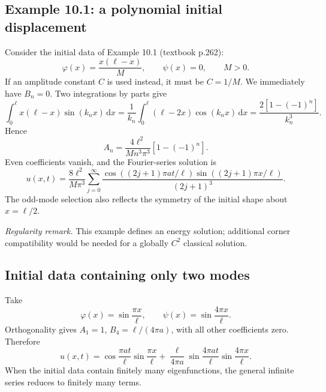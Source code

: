 \documentclass[11pt,a4paper]{article}
\newcommand{\dd}{\,\mathrm{d}}
\newif\ifteachernotes\teachernotesfalse
\newcommand{\teachernote}[1]{\ifteachernotes\par\smallskip
  \noindent\textit{Instructor note.} #1\par\smallskip\fi}
\begin{document}
\subsection{Example 10.1: a polynomial initial displacement}
Consider the initial data of Example 10.1 (textbook p.262):
\begin{equation}
 \varphi(x)=\frac{x(\ell-x)}M,\qquad \psi(x)=0,\qquad M>0.
\end{equation}
If an amplitude constant $C$ is used instead, it must be $C=1/M$.
We immediately have $B_n=0$. Two integrations by parts give
\begin{equation}
 \int_0^\ell x(\ell-x)\sin(k_nx)\dd x
 =\frac1{k_n}\int_0^\ell(\ell-2x)\cos(k_nx)\dd x
 =\frac{2[1-(-1)^n]}{k_n^3}.
\end{equation}
Hence
\begin{equation}
 A_n=\frac{4\ell^2}{Mn^3\pi^3}[1-(-1)^n].
\end{equation}
Even coefficients vanish, and the Fourier-series solution is
\begin{equation}
 u(x,t)=\frac{8\ell^2}{M\pi^3}\sum_{j=0}^\infty
 \frac{\cos((2j+1)\pi at/\ell)\sin((2j+1)\pi x/\ell)}{(2j+1)^3}.
\end{equation}
The odd-mode selection also reflects the symmetry of the initial shape about
$x=\ell/2$.
\teachernote{For nonzero amplitude these data have $\varphi''=-2/M$, so they do
 not satisfy the second-order corner compatibility required of a globally $C^2$
 fixed-end solution. The energy solution and the coefficient calculation remain
 valid. Second derivatives can lose continuity along characteristics from the
 initial corners; do not assert unrestricted twice-termwise differentiation.}
\emph{Regularity remark.} This example defines an energy solution; additional
corner compatibility would be needed for a globally $C^2$ classical solution.

\subsection{Initial data containing only two modes}
Take
\begin{equation}
 \varphi(x)=\sin\frac{\pi x}{\ell},\qquad
 \psi(x)=\sin\frac{4\pi x}{\ell}.
\end{equation}
Orthogonality gives $A_1=1$, $B_4=\ell/(4\pi a)$, with all other coefficients
zero. Therefore
\begin{equation}
 u(x,t)=\cos\frac{\pi at}{\ell}\sin\frac{\pi x}{\ell}
       +\frac\ell{4\pi a}\sin\frac{4\pi at}{\ell}\sin\frac{4\pi x}{\ell}.
\end{equation}
When the initial data contain finitely many eigenfunctions, the general infinite
series reduces to finitely many terms.
\end{document}

